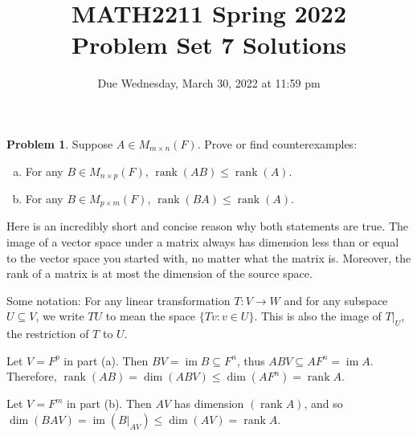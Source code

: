 \documentclass[11pt,oneside]{amsart}
\title{MATH2211 Spring 2022\\
Problem Set 7 Solutions}
\author{Due Wednesday, March 30, 2022 at 11:59 pm}
\theoremstyle{definition}
\newtheorem{problem}{Problem}
\DeclareMathOperator{\im}{im}
\DeclareMathOperator{\rank}{rank}
\begin{document}
    \maketitle
    
    \begin{problem}
        Suppose $A\in M_{m\times n}(F)$. Prove or find counterexamples:
        \begin{enumerate}[(a)]
            \item For any $B\in M_{n\times p}(F)$, $\rank(AB)\leq\rank(A)$.
            \item For any $B\in M_{p\times m}(F)$, $\rank(BA)\leq\rank(A)$.
        \end{enumerate}
        \begin{solution}
            Here is an incredibly short and concise reason why both statements are true. The image of a vector space under a matrix always has dimension less than or equal to the vector space you started with, no matter what the matrix is. Moreover, the rank of a matrix is at most the dimension of the source space.

            Some notation: For any linear transformation $T\colon V\to W$ and for any subspace $U\subseteq V$, we write $TU$ to mean the space $\{Tv:v\in U\}$. This is also the image of $T|_U$, the restriction of $T$ to $U$.

            Let $V=F^p$ in part (a). Then $BV=\im B\subseteq F^n$, thus $ABV\subseteq AF^n=\im A$. Therefore, $\rank(AB)=\dim(ABV)\leq\dim(AF^n)=\rank A$.

            Let $V=F^m$ in part (b). Then $AV$ has dimension $(\rank A)$, and so $\dim(BAV)=\im(B|_{AV})\leq \dim(AV)=\rank A$.
        \end{solution}
    \end{problem}
\end{document}
